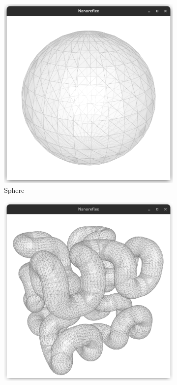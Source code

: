 \documentclass{stdlocal}
\begin{document}
  \begin{figure}
    \centering
    \begin{subfigure}[b]{0.23\linewidth}
      \centering
      \includegraphics[width=\linewidth,trim={25px 20 25 50},clip]{images/polyhedral-surface-sphere.png}
      \caption{Sphere}
    \end{subfigure}
    \hfill
    \begin{subfigure}[b]{0.23\linewidth}
      \centering
      \includegraphics[width=\linewidth,trim={25px 20 25 50},clip]{images/polyhedral-surface-hilbert-cube.png}

\end{subfigure}
\end{figure}
\end{document}
